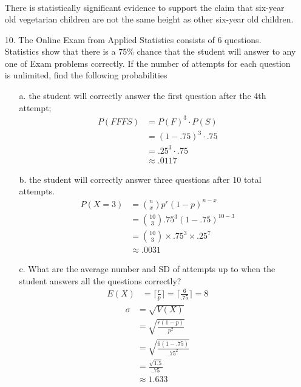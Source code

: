 \documentclass[letterpaper,12pt]{article}
\begin{document}
\begin{enumerate}
\begin{align*}
    \end{align*}
    There is statistically significant evidence to support the claim that six-year old vegetarian children are not the same height as other six-year old children.
  \item[10.]
    The Online Exam from Applied Statistics consists of 6 questions. Statistics show that there is a 75\% chance that the student will answer to any one of Exam problems correctly. If the number of attempts for each question is unlimited, find the following probabilities
    \begin{enumerate}
      \item[a.]
        the student will correctly answer the first question after the 4th attempt;
        \begin{align*}
          P(FFFS) &= P(F)^3 \cdot P(S) \\
          &= (1 - .75)^3 \cdot .75 \\
          &= .25^3 \cdot .75 \\
          &\approx .0117
        \end{align*}
      \item[b.]
        the student will correctly answer three questions after 10 total attempts.
        \begin{align*}
          P(X = 3) &= \binom{n}{x} p^r (1 - p)^{n - x} \\
          &= \binom{10}{3} .75^3 (1 - .75)^{10 - 3} \\
          &= \binom{10}{3} \times .75^3 \times .25^7 \\
          &\approx .0031
        \end{align*}
      \item[c.]
        What are the average number and SD of attempts up to when the student answers all the questions correctly?
        \begin{align*}
          E(X) &= \bigg\lceil \frac{r}{p} \bigg\rceil = \bigg\lceil \frac{6}{.75} \bigg\rceil = 8
        \end{align*}
        \begin{align*}
          \sigma &= \sqrt{V(X)} \\
          &= \sqrt{\frac{r(1 - p)}{p^2}} \\
          &= \sqrt{\frac{6(1 - .75)}{.75^2}} \\
          &= \frac{\sqrt{1.5}}{.75} \\
          &\approx 1.633
        \end{align*}
    \end{enumerate}
\end{enumerate}
\end{document}
